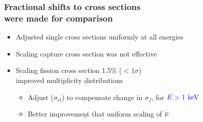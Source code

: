%
%	

\begin{frame}
    \frametitle{Fractional shifts to cross sections \\ were made for comparison }
\begin{itemize}
    \item[] Adjusted single cross sections uniformly at all energies 
        \\ 
    \item[] Scaling capture cross section was not effective \\
    \item[] Scaling fission cross section 1.5\% ($<1 \sigma$) 
        \\ improved multiplicity distributions
        \begin{itemize} \vspace{0.1in}
            \item Adjust  ($\sigma_{el}$) to compensate change in $\sigma_f$, for ${\color{blue} E > 1 \text { keV}}$
            \item Better improvement that uniform scaling of $\overline{\nu}$
        \end{itemize}
\end{itemize} 
\end{frame} 


